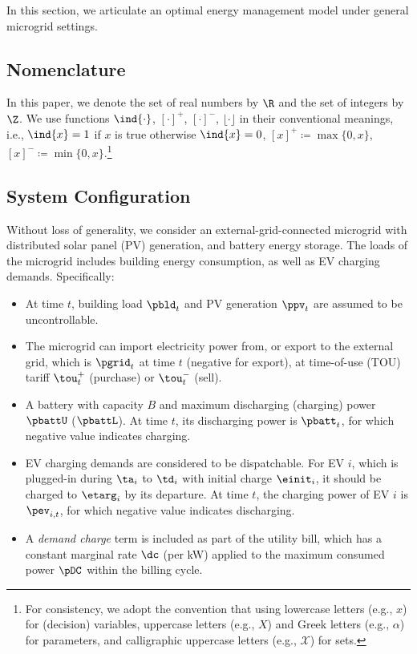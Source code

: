 In this section, we articulate an optimal energy management model under general microgrid settings.

\subsection{Nomenclature}
In this paper, we denote the set of real numbers by $\R$ and the set of integers by $\Z$. We use functions $\ind{\cdot}$, $[\cdot]^{+}$, $[\cdot]^{-}$, $\lfloor \cdot \rfloor$ in their conventional meanings, i.e., $\ind{x}=1$ if $x$ is true otherwise $\ind{x}=0$, $[x]^{+} \coloneqq \max\{0,x\}$, $[x]^{-} \coloneqq \min\{0,x\}$.\footnote{
For consistency, we adopt the convention that using lowercase letters (e.g., $x$) for (decision) variables, uppercase letters (e.g., $X$) and Greek letters (e.g., $\alpha$) for parameters, and calligraphic uppercase letters (e.g., $\mathcal{X}$) for sets.}

\subsection{System Configuration}
Without loss of generality, we consider an external-grid-connected microgrid with distributed solar panel (PV) generation, and battery energy storage. The loads of the microgrid includes building energy consumption, as well as EV charging demands. Specifically:

\begin{itemize}
    \item At time $t$, building load $\pbld_t$ and PV generation $\ppv_t$ are assumed to be uncontrollable.
    \item The microgrid can import electricity power from, or export to the external grid, which is $\pgrid_t$ at time $t$ (negative for export), at time-of-use (TOU) tariff $\tou^+_t$ (purchase) or $\tou^-_t$ (sell).
    \item A battery with capacity $B$ and maximum discharging (charging) power $\pbattU$ ($\pbattL$). At time $t$, its discharging power is $\pbatt_t$, for which negative value indicates charging.
    \item EV charging demands are considered to be dispatchable. For EV $i$, which is plugged-in during $\ta_i$ to $\td_i$ with initial charge $\einit_i$, it should be charged to $\etarg_i$ by its departure. At time $t$, the charging power of EV $i$ is $\pev_{i,t}$, for which negative value indicates discharging. %
    \item A \emph{demand charge} term is included as part of the utility bill, which has a constant marginal rate $\dc$ (per kW) applied to the maximum consumed power $\pDC$ within the billing cycle.%
\end{itemize}

